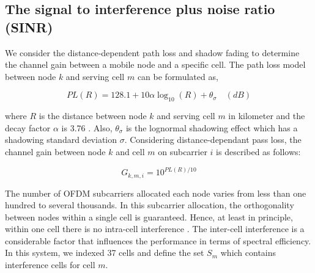 \documentclass[conference]{IEEEtran}
\begin{document}
\subsection{The signal to interference plus noise ratio (SINR)}

We consider the distance-dependent path loss and shadow fading to determine the channel gain between a mobile node and a specific cell. The path loss model between node \begin{math} k \end{math} and serving cell \begin{math} m \end{math} can be formulated as,

\begin{equation}
PL(R) = 128.1 + 10 \alpha \log_{10}(R) + \theta_\sigma \quad(dB)
\label{eq:eqs1}
\end{equation}

\noindent where \begin{math} R \end{math} is the distance between node \begin{math} k \end{math} and serving cell \begin{math} m \end{math} in kilometer and the decay factor \begin{math} \alpha \end{math} is 3.76  \cite{Sawahashi}. Also, \begin{math} \theta_\sigma \end{math} is the lognormal shadowing effect which has a shadowing standard deviation \begin{math} \sigma \end{math}. Considering distance-dependant pass loss, the channel gain between node $ k $ and cell $ m $ on subcarrier $ i $ is described as follows:


\begin{equation}
G_{k,m,i} = 10^{PL(R)/10}
\label{eq:eqs2}
\end{equation}

The number of OFDM subcarriers allocated each node varies from less than one hundred to several thousands. In this subcarrier allocation, the orthogonality between nodes within a single cell is guaranteed. Hence, at least in principle, within one cell there is no intra-cell interference \cite{Parkvall}. The inter-cell interference is a considerable factor that influences the performance in terms of spectral efficiency. In this system, we indexed 37 cells and define the set $ S_m $ which contains interference cells for cell $ m $.
\end{document}
